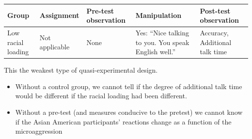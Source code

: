 \documentclass[
  english,
]{book}
\providecommand{\tightlist}{%
  \setlength{\itemsep}{0pt}\setlength{\parskip}{0pt}}
\begin{document}
\begin{longtable}[]{@{}lllll@{}}
\toprule
\begin{minipage}[b]{0.10\columnwidth}\raggedright
Group\strut
\end{minipage} & \begin{minipage}[b]{0.17\columnwidth}\raggedright
Assignment\strut
\end{minipage} & \begin{minipage}[b]{0.22\columnwidth}\raggedright
Pre-test observation\strut
\end{minipage} & \begin{minipage}[b]{0.15\columnwidth}\raggedright
Manipulation\strut
\end{minipage} & \begin{minipage}[b]{0.22\columnwidth}\raggedright
Post-test observation\strut
\end{minipage}\tabularnewline
\midrule
\endhead
\begin{minipage}[t]{0.10\columnwidth}\raggedright
Low racial loading\strut
\end{minipage} & \begin{minipage}[t]{0.17\columnwidth}\raggedright
Not applicable\strut
\end{minipage} & \begin{minipage}[t]{0.22\columnwidth}\raggedright
None\strut
\end{minipage} & \begin{minipage}[t]{0.15\columnwidth}\raggedright
Yes: ``Nice talking to you. You speak English well.''\strut
\end{minipage} & \begin{minipage}[t]{0.22\columnwidth}\raggedright
Accuracy, Additional talk time\strut
\end{minipage}\tabularnewline
\bottomrule
\end{longtable}

This the weakest type of quasi-experimental design.

\begin{itemize}
\tightlist
\item
  Without a control group, we cannot tell if the degree of additional talk time would be different if the racial loading had been different.
\item
  Without a pre-test (and measures conducive to the pretest) we cannot know if the Asian American participants' reactions change as a function of the microaggression
\end{itemize}
\end{document}

